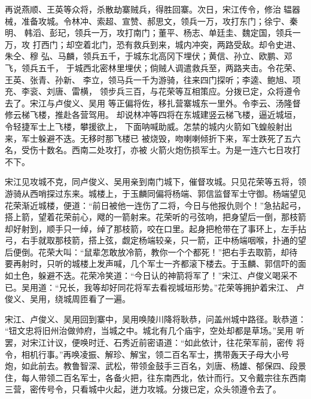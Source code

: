 再说燕顺、王英等众将，杀散劫寨贼兵，得胜回寨。次日，宋江传令，修治辒器
械，准备攻城。令林冲、索超、宣赞、郝思文，领兵一万，攻打东门；徐宁、秦明、
韩滔、彭玘，领兵一万，攻打南门；董平、杨志、单廷圭、魏定国，领兵一万，攻
打西门；却空着北门，恐有救兵到来，城内冲突，两路受敌。却令史进、朱仝、穆
弘、马麟，领兵五千，于城东北高冈下埋伏；黄信、孙立、欧鹏、邓飞，领兵五千，
于城西北密林里埋伏；倘贼人调遣救兵至，两路夹击。令花荣、王英、张青、孙新、
李立，领马兵一千为游骑，往来四门探听；李逵、鲍旭、项充、李衮、刘唐、雷横，
领步兵三百，与花荣等互相策应。分拨已定，众将遵令去了。宋江与卢俊义、吴用
等正偏将佐，移扎营寨城东一里外。令李云、汤隆督修云梯飞楼，推赴各营驾用。
却说林冲等四将在东城建竖云梯飞楼，逼近城垣，令轻捷军士上飞楼，攀援欲上，
下面呐喊助威。怎禁的城内火箭如飞蝗般射出来，军士躲避不迭。无移时那飞楼已
被烧毁，吻喇喇倾折下来，军士跌死了五六名，受伤十数名。西南二处攻打，亦被
火箭火炮伤损军士。为是一连六七日攻打不下。

宋江见攻城不克，同卢俊义、吴用亲到南门城下，催督攻城。只见花荣等五将，领
游骑从西哨探过东来。城楼上，于玉麟同偏将杨端、郭信监督军士守御。杨端望见
花荣渐近城楼，便道：“前日被他一连伤了二将，今日与他报仇则个！”急拈起弓，
搭上箭，望着花荣前心，飕的一箭射来。花荣听的弓弦响，把身望后一倒，那枝箭
却好射到，顺手只一绰，绰了那枝箭，咬在口里。起身把枪带在了事环上，左手拈
弓，右手就取那枝箭，搭上弦，觑定杨端较亲，只一箭，正中杨端咽喉，扑通的望
后便倒。花荣大叫：“鼠辈怎敢放冷箭，教你一个个都死！”把右手去取箭，却待
要再射时，只听的城楼上发声喊，几个军士一齐都滚下楼去。于玉麟、郭信吓的面
如土色，躲避不迭。花荣冷笑道：“今日认的神箭将军了！”宋江、卢俊义喝采不
已。吴用道：“兄长，我等却好同花将军去看视城垣形势。”花荣等拥护着宋江、
卢俊义、吴用，绕城周匝看了一遍。

宋江、卢俊义、吴用回到寨中，吴用唤陵川降将耿恭，问盖州城中路径。耿恭道：
“钮文忠将旧州治做帅府，当城之中。城北有几个庙宇，空处却都是草场。”吴用
听罢，对宋江计议，便唤时迁、石秀近前密语道：“如此依计，往花荣军前，密传
将令，相机行事。”再唤凌振、解珍、解宝，领二百名军士，携带轰天子母大小号
炮，如此前去。教鲁智深、武松，带领金鼓手三百名，刘唐、杨雄、郁保四、段景
住，每人带领二百名军士，各备火把，往东南西北，依计而行。又令戴宗往东西南
三营，密传号令，只看城中火起，迸力攻城。分拨已定，众头领遵令去了。

